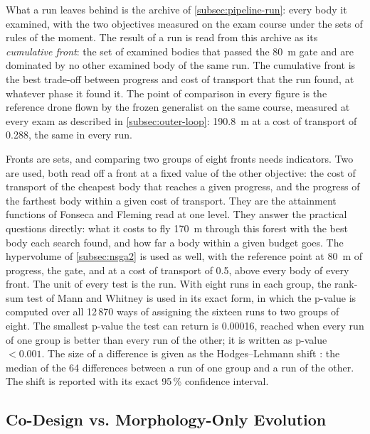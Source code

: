 What a run leaves behind is the archive of \autoref{subsec:pipeline-run}: every body it examined, with the two objectives measured on the exam course under the sets of rules of the moment. The result of a run is read from this archive as its \emph{cumulative front}: the set of examined bodies that passed the 80~m gate and are dominated by no other examined body of the same run. The cumulative front is the best trade-off between progress and cost of transport that the run found, at whatever phase it found it. The point of comparison in every figure is the reference drone flown by the frozen generalist on the same course, measured at every exam as described in \autoref{subsec:outer-loop}: 190.8~m at a cost of transport of 0.288, the same in every run.

Fronts are sets, and comparing two groups of eight fronts needs indicators. Two are used, both read off a front at a fixed value of the other objective: the cost of transport of the cheapest body that reaches a given progress, and the progress of the farthest body within a given cost of transport. They are the attainment functions of Fonseca and Fleming \cite{fonseca1996performance, lopezibanez2010exploratory} read at one level. They answer the practical questions directly: what it costs to fly 170~m through this forest with the best body each search found, and how far a body within a given budget goes. The hypervolume of \autoref{subsec:nsga2} is used as well, with the reference point at 80~m of progress, the gate, and at a cost of transport of 0.5, above every body of every front. The unit of every test is the run. With eight runs in each group, the rank-sum test of Mann and Whitney \cite{mann1947test} is used in its exact form, in which the p-value is computed over all 12\,870 ways of assigning the sixteen runs to two groups of eight. The smallest p-value the test can return is 0.00016, reached when every run of one group is better than every run of the other; it is written as p-value $< 0.001$. The size of a difference is given as the Hodges--Lehmann shift \cite{hodges1963estimates}: the median of the 64 differences between a run of one group and a run of the other. The shift is reported with its exact 95\,\% confidence interval.

\subsection{Co-Design vs. Morphology-Only Evolution}
\label{subsec:results-codesign-vs-morph}


